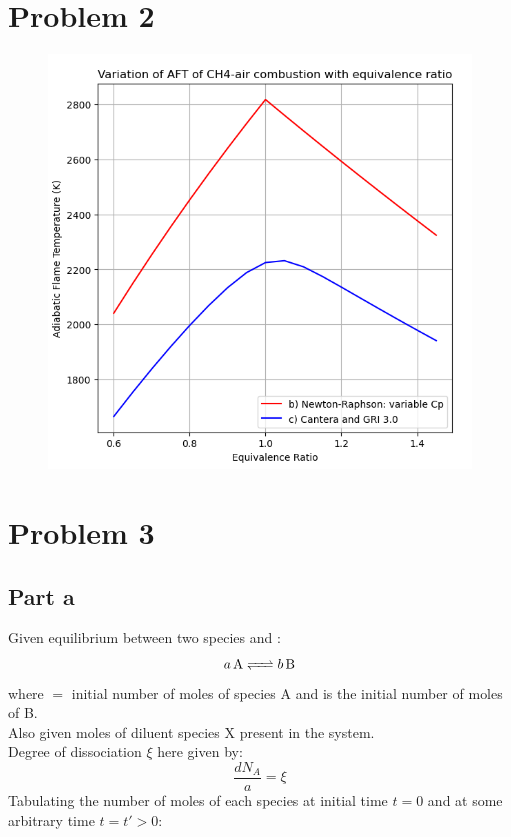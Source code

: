 \documentclass[a4paper,fleqn]{article}
\begin{document}
	\section*{Problem 2}
	\begin{figure}[!h]
	\includegraphics[width=17cm]{2}
	\centering
	\end{figure}
	\newpage
	\section*{Problem 3}
	\subsection*{Part a}
	Given equilibrium between two species  and :\\
	\begin{equation}
	 \ce{a A <=> b B}
	\end{equation}
	 where  $=$ initial number of moles of species A and  is the initial number of moles of B.\\
	 Also given  moles of diluent species X present in the system.\\
	 Degree of dissociation $\xi$ here given by:
	 \begin{equation}
	 \frac{dN_A}{a} = \xi
	 \end{equation}
Tabulating the number of moles of each species at initial time $t = 0$ and at some arbitrary time $t = t' > 0$:
	 
\end{document}
